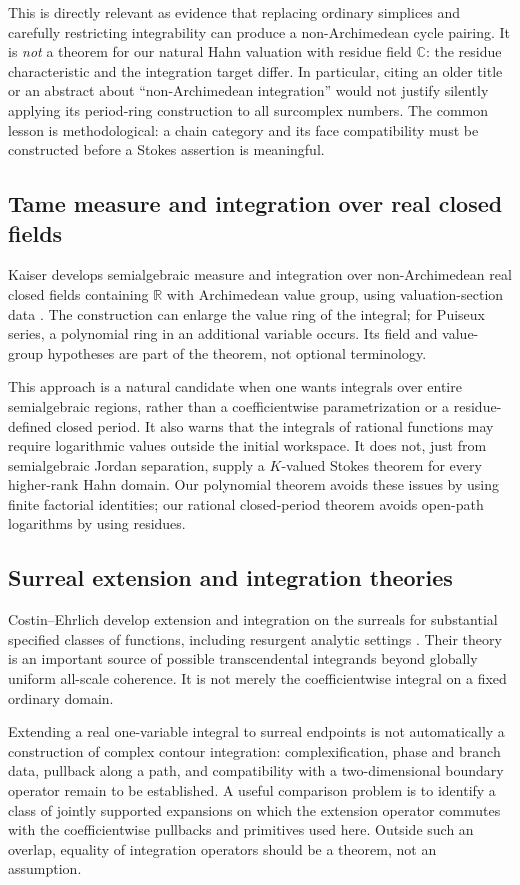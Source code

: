 \documentclass[11pt,letterpaper]{article}
\theoremstyle{definition}
\theoremstyle{remark}
\newcommand{\C}{\mathbb C}\newcommand{\R}{\mathbb R}\newcommand{\Q}{\mathbb Q}\newcommand{\Z}{\mathbb Z}\newcommand{\N}{\mathbb N}
\numberwithin{equation}{section}
\begin{document}
This is directly relevant as evidence that replacing ordinary simplices and carefully restricting integrability can produce a non-Archimedean cycle pairing. It is \emph{not} a theorem for our natural Hahn valuation with residue field $\C$: the residue characteristic and the integration target differ. In particular, citing an older title or an abstract about ``non-Archimedean integration'' would not justify silently applying its period-ring construction to all surcomplex numbers. The common lesson is methodological: a chain category and its face compatibility must be constructed before a Stokes assertion is meaningful.

\subsection{Tame measure and integration over real closed fields}
Kaiser develops semialgebraic measure and integration over non-Archimedean real closed fields containing $\R$ with Archimedean value group, using valuation-section data \cite{Kaiser}. The construction can enlarge the value ring of the integral; for Puiseux series, a polynomial ring in an additional variable occurs. Its field and value-group hypotheses are part of the theorem, not optional terminology.

This approach is a natural candidate when one wants integrals over entire semialgebraic regions, rather than a coefficientwise parametrization or a residue-defined closed period. It also warns that the integrals of rational functions may require logarithmic values outside the initial workspace. It does not, just from semialgebraic Jordan separation, supply a $K$-valued Stokes theorem for every higher-rank Hahn domain. Our polynomial theorem avoids these issues by using finite factorial identities; our rational closed-period theorem avoids open-path logarithms by using residues.

\subsection{Surreal extension and integration theories}
Costin--Ehrlich develop extension and integration on the surreals for substantial specified classes of functions, including resurgent analytic settings \cite{CE}. Their theory is an important source of possible transcendental integrands beyond globally uniform all-scale coherence. It is not merely the coefficientwise integral on a fixed ordinary domain.

Extending a real one-variable integral to surreal endpoints is not automatically a construction of complex contour integration: complexification, phase and branch data, pullback along a path, and compatibility with a two-dimensional boundary operator remain to be established. A useful comparison problem is to identify a class of jointly supported expansions on which the extension operator commutes with the coefficientwise pullbacks and primitives used here. Outside such an overlap, equality of integration operators should be a theorem, not an assumption.
\end{document}
